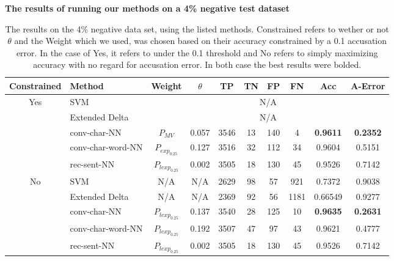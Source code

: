 \begin{table}[]
\centering
\textbf{The results of running our methods on a 4\% negative test dataset}\par\medskip
\begin{adjustbox}{center}
\begin{tabular}{|c|l|c|c|c|c|c|c|c|c|}
\hline
Constrained                & Method                  & Weight            & $\theta$ & TP  & TN & FP & FN  & Acc             & A-Error         \\ \hline
\multirow{5}{*}{Yes} & SVM                     & \multicolumn{8}{c|}{N/A}                                                                   \\ \cline{2-10} 
                     & Extended Delta          & \multicolumn{8}{c|}{N/A}                                                                   \\ \cline{2-10} 
                     & \gls{conv-char-NN}      & $P_{MV}$          & 0.057    & 3546 & 13  & 140 & 4    & \textbf{0.9611} & \textbf{0.2352} \\ \cline{2-10} 
                     & \gls{conv-char-word-NN} & $P_{exp_{0.25}}$  & 0.127    & 3516 & 32  & 112 & 34   & 0.9604          & 0.5151          \\ \cline{2-10} 
                     & \gls{rec-sent-NN}       & $P_{lexp_{0.25}}$ & 0.002    & 3505 & 18  & 130 & 45   & 0.9526          & 0.7142          \\ \hline\hline
\multirow{5}{*}{No}  & SVM                     & N/A               & N/A      & 2629 & 98  & 57  & 921  & 0.7372          & 0.9038          \\ \cline{2-10} 
                     & Extended Delta          & N/A               & N/A      & 2369 & 92  & 56  & 1181 & 0.66549         & 0.9277          \\ \cline{2-10} 
                     & \gls{conv-char-NN}      & $P_{lexp_{0.25}}$ & 0.137    & 3540 & 28  & 125 & 10   & \textbf{0.9635} & \textbf{0.2631} \\ \cline{2-10} 
                     & \gls{conv-char-word-NN} & $P_{lexp_{0.25}}$ & 0.192    & 3507 & 47  & 97  & 43   & 0.9621          & 0.4777          \\ \cline{2-10} 
                     & \gls{rec-sent-NN}       & $P_{lexp_{0.25}}$ & 0.002    & 3505 & 18  & 130 & 45   & 0.9526          & 0.7142          \\ \hline
\end{tabular}
\end{adjustbox}
\caption{The results on the 4\% negative data set, using the listed methods.
Constrained refers to wether or not $\theta$ and the Weight which we used,
was chosen based on their accuracy constrained by a 0.1 accusation error.
In the case of Yes, it refers to under the 0.1 threshold and No refers to simply
maximizing accuracy with no regard for accusation error. In both case
the best results were bolded.}
\label{tab:04_results}
\end{table}
